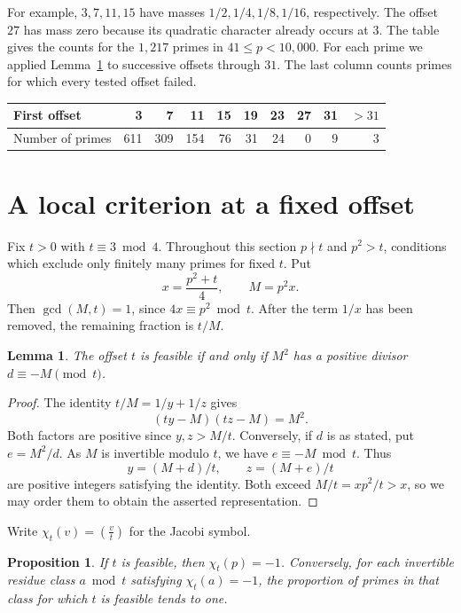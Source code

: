 \documentclass[11pt,a4paper]{article}
\newtheorem{lemma}[theorem]{Lemma}
\newtheorem{proposition}[theorem]{Proposition}
\theoremstyle{definition}
\newcommand{\jac}[2]{\left(\frac{#1}{#2}\right)}
\begin{document}
For example, \(3,7,11,15\) have masses \(1/2,1/4,1/8,1/16\),
respectively. The offset \(27\) has mass zero because its quadratic
character already occurs at \(3\). The table gives the counts for the
\(1{,}217\) primes in \(41\le p<10{,}000\). For each prime we applied
Lemma~\ref{lem:div} to successive offsets through \(31\). The last
column counts primes for which every tested offset failed.

\begin{center}
\small
\begin{tabular}{lrrrrrrrrr}
\toprule
First offset & 3 & 7 & 11 & 15 & 19 & 23 & 27 & 31 & \(>31\)\\
\midrule
Number of primes & 611 & 309 & 154 & 76 & 31 & 24 & 0 & 9 & 3\\
\bottomrule
\end{tabular}
\end{center}

\section{A local criterion at a fixed offset}

Fix \(t>0\) with \(t\equiv3\bmod4\). Throughout this section
\(p\nmid t\) and \(p^2>t\), conditions which exclude only finitely
many primes for fixed \(t\). Put
\[
  x=\frac{p^2+t}{4},\qquad M=p^2x.
\]
Then \(\gcd(M,t)=1\), since \(4x\equiv p^2\bmod t\).
After the term \(1/x\) has been removed, the remaining fraction is
\(t/M\).

\begin{lemma}\label{lem:div}
The offset \(t\) is feasible if and only if \(M^2\) has a positive
divisor \(d\equiv-M\pmod t\).
\end{lemma}

\begin{proof}
The identity \(t/M=1/y+1/z\) gives
\[
  (ty-M)(tz-M)=M^2.
\]
Both factors are positive since \(y,z>M/t\). Conversely, if \(d\)
is as stated, put \(e=M^2/d\). As \(M\) is invertible modulo \(t\),
we have \(e\equiv-M\bmod t\). Thus
\[
  y=(M+d)/t,\qquad z=(M+e)/t
\]
are positive integers satisfying the identity. Both exceed
\(M/t=xp^2/t>x\), so we may order them to obtain the asserted
representation.
\end{proof}

Write \(\chi_t(v)=\jac{v}{t}\) for the Jacobi symbol.

\begin{proposition}\label{prop:fixed}
If \(t\) is feasible, then \(\chi_t(p)=-1\). Conversely, for each
invertible residue class \(a\bmod t\) satisfying \(\chi_t(a)=-1\),
the proportion of primes in that class for which \(t\) is feasible
tends to one.
\end{proposition}
\end{document}
